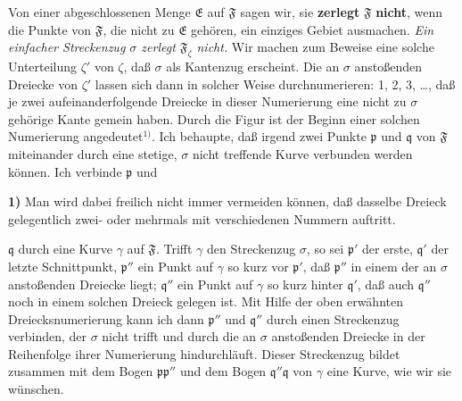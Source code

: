 \documentclass{article}
\begin{document}
Von einer abgeschlossenen Menge $\mathfrak{E}$ auf $\mathfrak{F}$ sagen wir, sie \textbf{zerlegt} $\mathfrak{F}$ \textbf{nicht}, wenn die Punkte von $\mathfrak{F}$, die nicht zu $\mathfrak{E}$ gehören, ein einziges Gebiet ausmachen. \emph{Ein einfacher Streckenzug $\sigma$ zerlegt $\mathfrak{F}_\zeta$ nicht.} Wir machen zum Beweise eine solche Unterteilung $\zeta'$ von $\zeta$, daß $\sigma$ als Kantenzug erscheint. Die an $\sigma$ anstoßenden Dreiecke von $\zeta'$ lassen sich dann in solcher Weise durchnumerieren: 1, 2, 3, \dots, daß je zwei aufeinanderfolgende Dreiecke in dieser Numerierung eine nicht zu $\sigma$ gehörige Kante gemein haben. Durch die Figur ist der Beginn einer solchen Numerierung angedeutet${}^{1)}$. Ich behaupte, daß irgend zwei Punkte $\mathfrak{p}$ und $\mathfrak{q}$ von $\mathfrak{F}$ miteinander durch eine stetige, $\sigma$ nicht treffende Kurve verbunden werden können. Ich verbinde $\mathfrak{p}$ und

\textbf{1)} Man wird dabei freilich nicht immer vermeiden können, daß dasselbe Dreieck gelegentlich zwei- oder mehrmals mit verschiedenen Nummern auftritt.

$\mathfrak{q}$ durch eine Kurve $\gamma$ auf $\mathfrak{F}$. Trifft $\gamma$ den Streckenzug $\sigma$, so sei $\mathfrak{p}'$ der erste, $\mathfrak{q}'$ der letzte Schnittpunkt, $\mathfrak{p}''$ ein Punkt auf $\gamma$ so kurz vor $\mathfrak{p}'$, daß $\mathfrak{p}''$ in einem der an $\sigma$ anstoßenden Dreiecke liegt; $\mathfrak{q}''$ ein Punkt auf $\gamma$ so kurz hinter $\mathfrak{q}'$, daß auch $\mathfrak{q}''$ noch in einem solchen Dreieck gelegen ist. Mit Hilfe der oben erwähnten Dreiecksnumerierung kann ich dann $\mathfrak{p}''$ und $\mathfrak{q}''$ durch einen Streckenzug verbinden, der $\sigma$ nicht trifft und durch die an $\sigma$ anstoßenden Dreiecke in der Reihenfolge ihrer Numerierung hindurchläuft. Dieser Streckenzug bildet zusammen mit dem Bogen $\mathfrak{p}\mathfrak{p}''$ und dem Bogen $\mathfrak{q}''\mathfrak{q}$ von $\gamma$ eine Kurve, wie wir sie wünschen.
\end{document}
